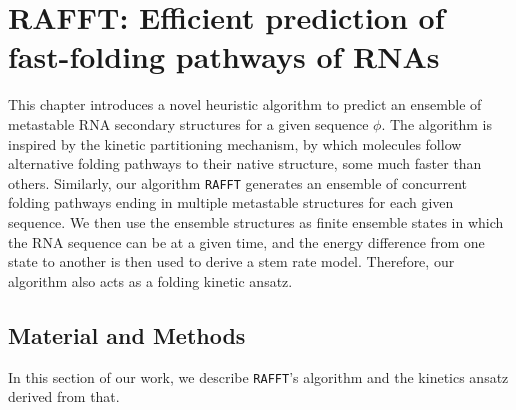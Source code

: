 \chapter{RAFFT: Efficient prediction of fast-folding pathways of RNAs}\label{ch:rafft}
This chapter introduces a novel heuristic algorithm to predict an ensemble of metastable RNA secondary structures for a given sequence $\phi$. The algorithm is inspired by the kinetic partitioning mechanism, by which molecules follow alternative folding pathways to their native structure, some much faster than others. Similarly, our algorithm \texttt{RAFFT} generates an ensemble of concurrent folding pathways ending in multiple metastable structures for each given sequence. We then use the ensemble structures as finite ensemble states in which the RNA sequence can be at a given time, and the energy difference from one state to another is then used to derive a stem rate model. Therefore, our algorithm also acts as a folding kinetic ansatz. 
\section{Material and Methods}
In this section of our work, we describe \texttt{RAFFT}'s algorithm and the kinetics ansatz derived from that.
